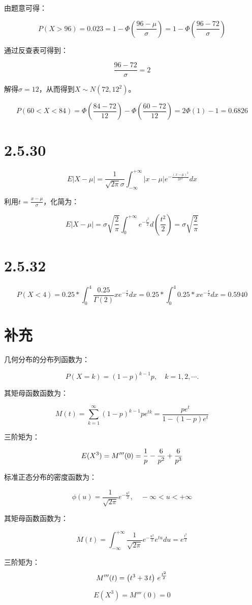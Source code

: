 \documentclass{article}
\begin{document}
由题意可得：

$$P(X>96)=0.023=1-\Phi(\frac{96-\mu}{\sigma})=1-\Phi(\frac{96-72}{\sigma})$$

通过反查表可得到：

$$\frac{96-72}{\sigma}=2$$

解得$\sigma=12$，从而得到$X\sim N(72,12^2)$。

$$P(60<X<84)=\Phi(\frac{84-72}{12})-\Phi(\frac{60-72}{12})=2\Phi(1)-1=0.6826$$

\section{2.5.30}

$$E|X-\mu|=\frac{1}{\sqrt{2\pi}\sigma}\int_{-\infty}^{+\infty}|x-\mu|e^{-\frac{(x-\mu)^2}{2\sigma^2}}dx$$

利用$t=\frac{x-\mu}{\sigma}$，化简为：

$$E|X-\mu|=\sigma\sqrt{\frac{2}{\pi}}\int_0^{+\infty}e^{-\frac{t^2}{2}}d(\frac{t^2}{2})=\sigma\sqrt{\frac{2}{\pi}}$$

\section{2.5.32}

$$P(X<4)=0.25*\int^{4}_{0}\frac{0.25}{\Gamma(2)}xe^{-\frac{x}{2}}dx=0.25*\int^{4}_{0}0.25*xe^{-\frac{x}{2}}dx=0.5940$$
\section{补充}
几何分布的分布列函数为：

$$P(X=k)=(1-p)^{k-1}p,\quad k=1,2,\cdots.$$

其矩母函数函数为：

$$M(t)=\sum_{k=1}^{\infty}(1-p)^{k-1}pe^{tk}=\frac{pe^t}{1-(1-p)e^t}$$

三阶矩为：

$$E(X^3)=M'''(0)={{1}\over{p}}-{{6}\over{p^2}}+{{6}\over{p^3}}$$

标准正态分布的密度函数为：

$$\phi (u)=\frac1{\sqrt{2\pi}}e^{-\frac{u^2}{2}},\quad -\infty<u<+\infty$$

其矩母函数函数为：

$$M(t)=\int_{-\infty}^{+\infty}\frac1{\sqrt{2\pi}}e^{-\frac{u^2}{2}}e^{tu}du=e^{\frac{t^2}{2}}$$

三阶矩为：
$$M'''(t) = \left(t^3+3\,t\right)\,e^{{{t^2}\over{2}}}$$

$$E(X^3)=M'''(0)=0$$
\end{document}
